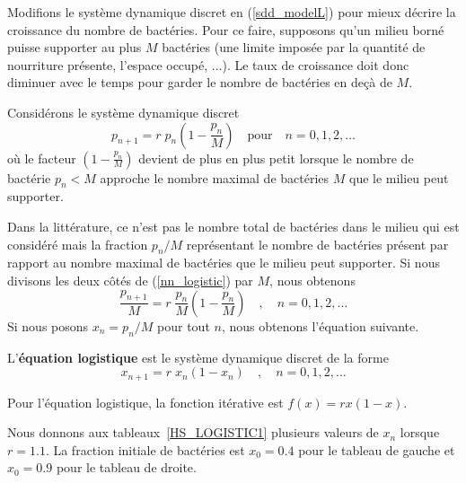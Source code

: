 {Modifions le système dynamique discret en (\ref{sdd_modelL}) pour
mieux décrire la croissance du nombre de bactéries.  Pour ce faire,
supposons qu'un milieu borné puisse supporter au plus $M$ bactéries
(une limite imposée par la quantité de nourriture présente, l'espace
occupé, ...).  Le taux de croissance doit donc diminuer avec le temps
pour garder le nombre de bactéries en deçà de $M$.

Considérons le système dynamique discret
\begin{equation}\label{nn_logistic}
p_{n+1} = r\;p_n\left( 1 - \frac{p_n}{M}\right) \quad \text{pour} \quad
n=0,1,2,\ldots
\end{equation}
où le facteur $\displaystyle \left( 1 - \frac{p_n}{M}\right)$ devient
de plus en plus petit lorsque le nombre de bactérie $p_n < M$ approche
le nombre maximal de bactéries $M$ que le milieu peut supporter.

Dans la littérature, ce n'est pas le nombre total de bactéries
dans le milieu qui est considéré mais la fraction $p_n/M$ représentant
le nombre de bactéries présent par rapport au nombre maximal de
bactéries que le milieu peut supporter.  Si nous divisons les deux
côtés de (\ref{nn_logistic}) par $M$, nous obtenons
\[
\frac{p_{n+1}}{M} = r\;\frac{p_n}{M}\left( 1 - \frac{p_n}{M}\right)
\quad , \quad n=0,1,2,\ldots
\]
Si nous posons $x_n = p_n/M$ pour tout $n$, nous obtenons l'équation
suivante.

\begin{defn} 
L'{\bfseries équation logistique} est le
système dynamique discret de la forme
\begin{equation}\label{logistic}
x_{n+1} = r\;x_n ( 1-x_n) \quad , \quad n=0, 1, 2, \ldots
\end{equation}
\label{defOfLogEqu}
\end{defn}

Pour l'équation logistique, la fonction itérative est
$f(x) = r x(1-x)$.

Nous donnons aux tableaux~\ref{HS_LOGISTIC1} plusieurs valeurs de $x_n$
lorsque $r=1.1$.  La fraction initiale de bactéries est $x_0 = 0.4$
pour le tableau de gauche et $x_0 = 0.9$ pour le tableau de droite.

}
